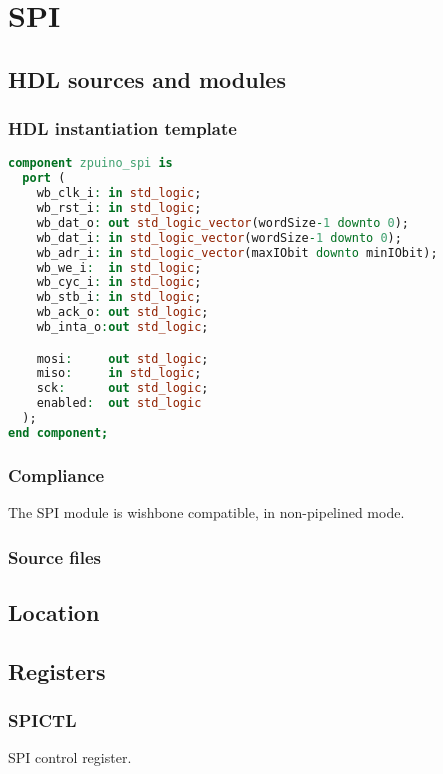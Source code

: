 \section{SPI}
\subsection{HDL sources and modules}
\subsubsection{HDL instantiation template}
\begin{lstlisting}[language=VHDL]
component zpuino_spi is
  port (
    wb_clk_i: in std_logic;
    wb_rst_i: in std_logic;
    wb_dat_o: out std_logic_vector(wordSize-1 downto 0);
    wb_dat_i: in std_logic_vector(wordSize-1 downto 0);
    wb_adr_i: in std_logic_vector(maxIObit downto minIObit);
    wb_we_i:  in std_logic;
    wb_cyc_i: in std_logic;
    wb_stb_i: in std_logic;
    wb_ack_o: out std_logic;
    wb_inta_o:out std_logic;

    mosi:     out std_logic;
    miso:     in std_logic;
    sck:      out std_logic;
    enabled:  out std_logic
  );
end component;
\end{lstlisting}

\subsubsection{Compliance}
The SPI module is wishbone compatible, in non-pipelined mode.

\subsubsection{Source files}

\subsection{Location}

\subsection{Registers}

\subsubsection{SPICTL}
SPI control register.

